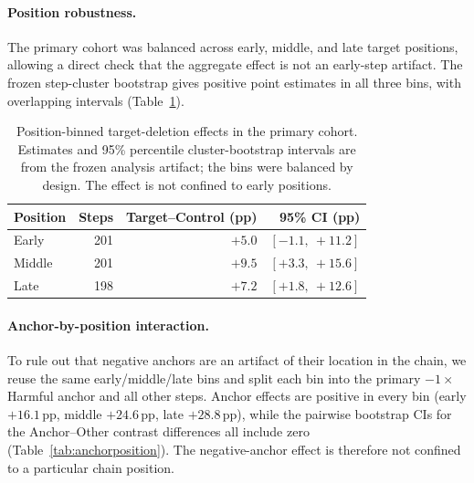 \documentclass[11pt]{article}
\begin{document}
\paragraph{Position robustness.}
The primary cohort was balanced across early, middle, and late target positions, allowing a direct check that the aggregate effect is not an early-step artifact. The frozen step-cluster bootstrap gives positive point estimates in all three bins, with overlapping intervals (Table~\ref{tab:position}).

\begin{table}[t]
\centering
\scriptsize
\setlength{\tabcolsep}{3.5pt}
\begin{tabular}{@{}lrrr@{}}
\toprule
Position & Steps & Target--Control (pp) & 95\% CI (pp) \\
\midrule
Early  & 201 & $+5.0$ & $[-1.1,\ +11.2]$ \\
Middle & 201 & $+9.5$ & $[+3.3,\ +15.6]$ \\
Late   & 198 & $+7.2$ & $[+1.8,\ +12.6]$ \\
\bottomrule
\end{tabular}
\caption{Position-binned target-deletion effects in the primary cohort. Estimates and 95\% percentile cluster-bootstrap intervals are from the frozen analysis artifact; the bins were balanced by design. The effect is not confined to early positions.}
\label{tab:position}
\end{table}

\paragraph{Anchor-by-position interaction.}
To rule out that negative anchors are an artifact of their location in the chain, we reuse the same early/middle/late bins and split each bin into the primary $-1\times$Harmful anchor and all other steps. Anchor effects are positive in every bin (early $+16.1$\,pp, middle $+24.6$\,pp, late $+28.8$\,pp), while the pairwise bootstrap CIs for the Anchor--Other contrast differences all include zero (Table~\ref{tab:anchorposition}). The negative-anchor effect is therefore not confined to a particular chain position.
\end{document}
